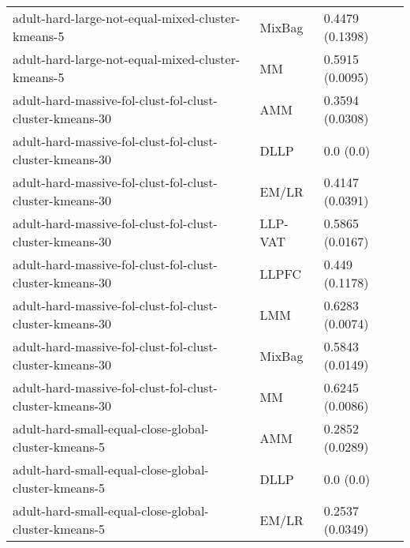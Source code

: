 \begin{longtable}{lll}
                                                            adult-hard-large-not-equal-mixed-cluster-kmeans-5 &    MixBag &                       0.4479 (0.1398) \\
                                                            adult-hard-large-not-equal-mixed-cluster-kmeans-5 &        MM &                       0.5915 (0.0095) \\
                                                     adult-hard-massive-fol-clust-fol-clust-cluster-kmeans-30 &       AMM &                       0.3594 (0.0308) \\
                                                     adult-hard-massive-fol-clust-fol-clust-cluster-kmeans-30 &      DLLP &                             0.0 (0.0) \\
                                                     adult-hard-massive-fol-clust-fol-clust-cluster-kmeans-30 &     EM/LR &                       0.4147 (0.0391) \\
                                                     adult-hard-massive-fol-clust-fol-clust-cluster-kmeans-30 &   LLP-VAT &                       0.5865 (0.0167) \\
                                                     adult-hard-massive-fol-clust-fol-clust-cluster-kmeans-30 &     LLPFC &                        0.449 (0.1178) \\
                                                     adult-hard-massive-fol-clust-fol-clust-cluster-kmeans-30 &       LMM &                       0.6283 (0.0074) \\
                                                     adult-hard-massive-fol-clust-fol-clust-cluster-kmeans-30 &    MixBag &                       0.5843 (0.0149) \\
                                                     adult-hard-massive-fol-clust-fol-clust-cluster-kmeans-30 &        MM &                       0.6245 (0.0086) \\
                                                         adult-hard-small-equal-close-global-cluster-kmeans-5 &       AMM &                       0.2852 (0.0289) \\
                                                         adult-hard-small-equal-close-global-cluster-kmeans-5 &      DLLP &                             0.0 (0.0) \\
                                                         adult-hard-small-equal-close-global-cluster-kmeans-5 &     EM/LR &                       0.2537 (0.0349) \\

\end{longtable}
